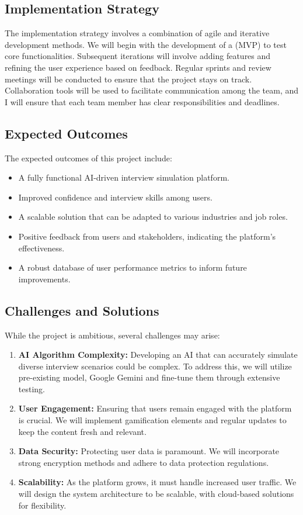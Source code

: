 \subsection{Implementation Strategy}
The implementation strategy involves a combination of agile and iterative development methods. We will begin with the development of a (\gls{MVP}) to test core functionalities. Subsequent iterations will involve adding features and refining the user experience based on feedback. Regular sprints and review meetings will be conducted to ensure that the project stays on track. Collaboration tools will be used to facilitate communication among the team, and I will ensure that each team member has clear responsibilities and deadlines.

\subsection{Expected Outcomes}
The expected outcomes of this project include:
\begin{itemize}
    \item A fully functional AI-driven interview simulation platform.
    \item Improved confidence and interview skills among users.
    \item A scalable solution that can be adapted to various industries and job roles.
    \item Positive feedback from users and stakeholders, indicating the platform's effectiveness.
    \item A robust database of user performance metrics to inform future improvements.
\end{itemize}

\subsection{Challenges and Solutions}
While the project is ambitious, several challenges may arise:
\begin{enumerate}[label=(\alph*)]
    \item \textbf{AI Algorithm Complexity:} Developing an AI that can accurately simulate diverse interview scenarios could be complex. To address this, we will utilize pre-existing model, Google Gemini and fine-tune them through extensive testing.
    \item \textbf{User Engagement:} Ensuring that users remain engaged with the platform is crucial. We will implement gamification elements and regular updates to keep the content fresh and relevant.
    \item \textbf{Data Security:} Protecting user data is paramount. We will incorporate strong encryption methods and adhere to data protection regulations.
    \item \textbf{Scalability:} As the platform grows, it must handle increased user traffic. We will design the system architecture to be scalable, with cloud-based solutions for flexibility.
\end{enumerate}